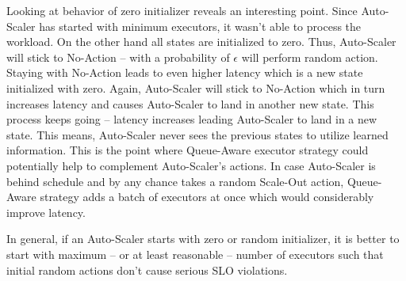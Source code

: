 Looking at behavior of zero initializer reveals an interesting point. Since Auto-Scaler has started with minimum executors, it wasn't able to process the workload. On the other hand all states are initialized to zero. Thus, Auto-Scaler will stick to No-Action -- with a probability of $\epsilon$ will perform random action. Staying with No-Action leads to even higher latency which is a new state initialized with zero. Again, Auto-Scaler will stick to No-Action which in turn increases latency and causes Auto-Scaler to land in another new state. This process keeps going -- latency increases leading Auto-Scaler to land in a new state. This means, Auto-Scaler never sees the previous states to utilize learned information. This is the point where Queue-Aware executor strategy could potentially help to complement Auto-Scaler's actions. In case Auto-Scaler is behind schedule and by any chance takes a random Scale-Out action, Queue-Aware strategy adds a batch of executors at once which would considerably improve latency.

In general, if an Auto-Scaler starts with zero or random initializer, it is better to start with maximum -- or at least reasonable -- number of executors such that initial random actions don't cause serious SLO violations.

\clearpage
